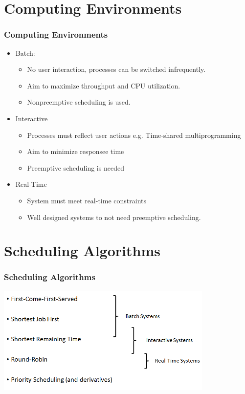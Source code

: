 \documentclass{beamer}
\begin{document}
\section{Computing Environments}
\begin{frame}
\frametitle{Computing Environments}
\begin{itemize}
\item Batch:
\begin{itemize}
\item No user interaction, processes can be switched infrequently.
\item Aim to maximize throughput and CPU utilization.
\item Nonpreemptive scheduling is used.
\end{itemize}
\item Interactive
\begin{itemize}
\item Processes must reflect user actions e.g. Time-shared multiprogramming
\item Aim to minimize responsee time
\item Preemptive scheduling is needed
\end{itemize}
\item Real-Time
\begin{itemize}
\item System must meet real-time constraints
\item Well designed systems to not need preemptive scheduling.
\end{itemize}
\end{itemize}
\end{frame}
\section{Scheduling Algorithms}
\begin{frame}
\frametitle{Scheduling Algorithms}
\includegraphics[scale=0.5]{specif.png}
\end{frame}
\end{document}
